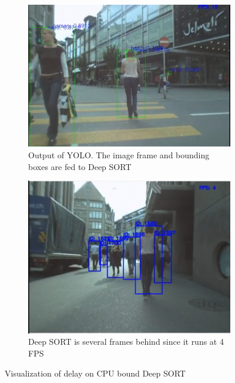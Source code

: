 \begin{figure}[ht]
    \begin{subfigure}[b]{.45\textwidth}
        \centering
        \includegraphics[width=1.0\linewidth]{img/chapter5_implementation/deepSortCPU.png}
        \caption{Output of YOLO. The image frame and bounding boxes are fed to Deep SORT}
    \end{subfigure}%
    \hspace{\fill} 
    \begin{subfigure}[b]{.45\textwidth}
        \centering
        \includegraphics[width=0.935\linewidth]{img/chapter5_implementation/deepSortCPU1.png}
        \caption{Deep SORT is several frames behind since it runs at 4 FPS}
    \end{subfigure}
    \vspace{-1\baselineskip}
    \begin{center}
        \caption{Visualization of delay on CPU bound Deep SORT}
        \label{fig:deepSortCPU}
    \end{center}
\end{figure}


